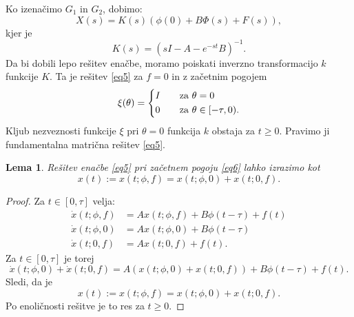 \documentclass[12pt,a4paper]{amsart}
\theoremstyle{definition} %
\theoremstyle{plain} %
\newtheorem{lema}[definicija]{Lema}
\begin{document}
\noindent Ko izenačimo $G_1$ in $G_2$, dobimo:
\[X(s)=K(s)(\phi(0)+B\Phi(s)+F(s)),\]
kjer je 
\[K(s)=(sI-A-e^{-st}B)^{-1}.\]
Da bi dobili lepo rešitev enačbe, moramo poiskati inverzno transformacijo $k$ funkcije $K$. Ta je rešitev \eqref{eq5}
 za $f=0$ in z začetnim pogojem
\[
        \xi(\theta) =
        \begin{dcases}
            I &\quad \text{za  } \theta=0 \\
            0 &\quad \text{za  } \theta \in [-\tau,0). \\
        \end{dcases}
    \]
Kljub nezveznosti funkcije $\xi$ pri $\theta=0$ funkcija $k$ obstaja za $t\geq0$. Pravimo ji fundamentalna matrična
rešitev \eqref{eq5}.

\begin{lema}
    Rešitev enačbe \eqref{eq5} pri začetnem pogoju \eqref{eq6} lahko izrazimo kot
    \[x(t):=x(t;\phi,f)=x(t;\phi,0)+x(t;0,f).\]
\end{lema}

\begin{proof}
    Za $t\in [0,\tau]$ velja:
    \begin{equation*}
        \begin{split}
            \dot{x}(t;\phi,f) &= Ax(t;\phi,f)+B\phi(t-\tau)+f(t) \\
            \dot{x}(t;\phi,0)  &= Ax(t;\phi,0)+B\phi(t-\tau)\\
            \dot{x}(t;0,f)  &= Ax(t;0,f)+f(t).
        \end{split}      
    \end{equation*}
Za $t\in[0,\tau]$ je torej
\[\dot{x}(t;\phi,0)+\dot{x}(t;0,f)=A\left(x(t;\phi,0)+x(t;0,f)\right)+B\phi(t-\tau)+f(t).\]
Sledi, da je
\[x(t):=x(t;\phi,f)=x(t;\phi,0)+x(t;0,f).\]
Po enoličnosti rešitve je to res za $t\geq0$.
\end{proof}
\end{document}
